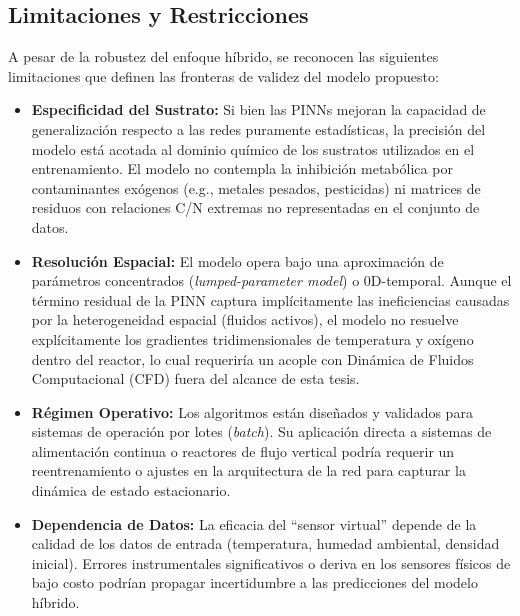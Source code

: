 \subsection{Limitaciones y Restricciones}
A pesar de la robustez del enfoque híbrido, se reconocen las siguientes limitaciones que definen las fronteras de validez del modelo propuesto:
\begin{itemize}
    \item \textbf{Especificidad del Sustrato:} Si bien las PINNs mejoran la capacidad de generalización respecto a las redes puramente estadísticas, la precisión del modelo está acotada al dominio químico de los sustratos utilizados en el entrenamiento. El modelo no contempla la inhibición metabólica por contaminantes exógenos (e.g., metales pesados, pesticidas) ni matrices de residuos con relaciones C/N extremas no representadas en el conjunto de datos.
    \item \textbf{Resolución Espacial:} El modelo opera bajo una aproximación de parámetros concentrados (\textit{lumped-parameter model}) o 0D-temporal. Aunque el término residual de la PINN captura implícitamente las ineficiencias causadas por la heterogeneidad espacial (fluidos activos), el modelo no resuelve explícitamente los gradientes tridimensionales de temperatura y oxígeno dentro del reactor, lo cual requeriría un acople con Dinámica de Fluidos Computacional (CFD) fuera del alcance de esta tesis.
    \item \textbf{Régimen Operativo:} Los algoritmos están diseñados y validados para sistemas de operación por lotes (\textit{batch}). Su aplicación directa a sistemas de alimentación continua o reactores de flujo vertical podría requerir un reentrenamiento o ajustes en la arquitectura de la red para capturar la dinámica de estado estacionario.
    \item \textbf{Dependencia de Datos:} La eficacia del ``sensor virtual'' depende de la calidad de los datos de entrada (temperatura, humedad ambiental, densidad inicial). Errores instrumentales significativos o deriva en los sensores físicos de bajo costo podrían propagar incertidumbre a las predicciones del modelo híbrido.
\end{itemize}
